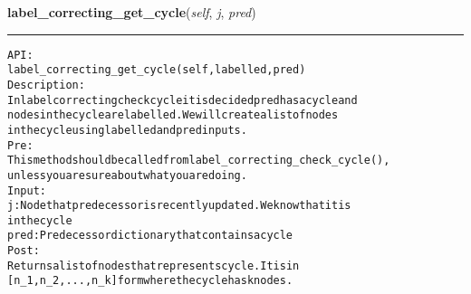     \label{coinor:gimpy:graph:Graph:label_correcting_get_cycle}

    \vspace{0.5ex}

\hspace{.8\funcindent}\begin{boxedminipage}{\funcwidth}

    \raggedright \textbf{label\_correcting\_get\_cycle}(\textit{self}, \textit{j}, \textit{pred})

    \vspace{-1.5ex}

    \rule{\textwidth}{0.5\fboxrule}
\setlength{\parskip}{2ex}
\begin{alltt}

API:
    label\_correcting\_get\_cycle(self, labelled, pred)
Description:
    In label correcting check cycle it is decided pred has a cycle and
    nodes in the cycle are labelled. We will create a list of nodes
    in the cycle using labelled and pred inputs.
Pre:
    This method should be called from label\_correcting\_check\_cycle(),
    unless you are sure about what you are doing.
Input:
    j: Node that predecessor is recently updated. We know that it is
    in the cycle
    pred: Predecessor dictionary that contains a cycle
Post:
    Returns a list of nodes that represents cycle. It is in
    [n\_1, n\_2, ..., n\_k] form where the cycle has k nodes.
\end{alltt}

\setlength{\parskip}{1ex}
    \end{boxedminipage}

    \label{coinor:gimpy:graph:Graph:label_strong_component}

    \vspace{0.5ex}

